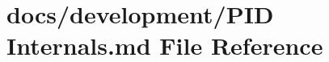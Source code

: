 \hypertarget{PID_01Internals_8md}{\section{docs/development/\+P\+I\+D Internals.\+md File Reference}
\label{PID_01Internals_8md}
}
